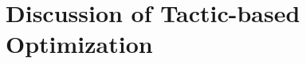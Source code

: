 \documentclass{sigplanconf}
\newcommand{\greg}[1]{\textcolor{blue}{GREG: #1}}
\newcommand{\ltac}[0]{\ensuremath{\mathcal{L}_{\mathrm{tac}}}}
\begin{document}





\section{Discussion of Tactic-based Optimization}
\label{sec:discussion}
\end{document}
